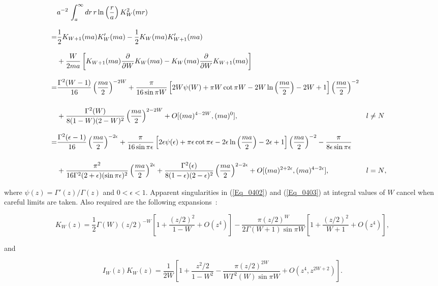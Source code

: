 \documentclass[a4paper,twocolumn,showpacs,preprintnumbers,amsmath,amssymb]{revtex4}
\newcommand{\half}{\frac{1}{2}}
\newcommand{\pdo}[1]{\ensuremath{\frac{\partial }
        {\partial #1 }}}
\begin{document}
\begin{widetext}
\begin{alignat}{2}
\label{Eq_0401}
\nonumber
\lefteqn{a^{-2} \,
 \int^{\infty}_a dr \, r \ln \left(\frac{r}{a}\right) K^2_W(mr)}\\[3mm]
\nonumber
  =& \half K_{W+1}(ma) K'_W(ma) - \half K_W(ma) K'_{W+1}(ma)&&\\[3mm]
  &  + \frac{W}{2ma}
  \left[
  K_{W+1}(ma) \pdo{W}K_W(ma) - K_W(ma) \pdo{W}K_{W+1}(ma)
  \right]&&\\[3mm]
\label{Eq_0402}
\nonumber
  =& \frac{\Gamma^2(W-1)}{16} \left(\frac{ma}{2}\right)^{-2W}
  + \frac{\pi}{16 \sin \pi W}
  \left[
  2W \psi(W) + \pi W \cot \pi W
  - 2W \ln \left(\frac{ma}{2}\right) - 2W + 1
  \right]
  \left(\frac{ma}{2}\right)^{-2}&\\[5mm]
  &
  + \frac{\Gamma^2(W)}{8 (1-W) (2-W)^2} \left(\frac{ma}{2}\right)^{2-2W}
  + O[(ma)^{4-2W}, (ma)^0],& l \neq N&\\[3mm]
\label{Eq_0403}
\nonumber
  =& \frac{\Gamma^2(\epsilon - 1)}{16}
  \left(\frac{ma}{2}\right)^{-2\epsilon} + \frac{\pi}{16 \sin \pi\epsilon}
  \left[
  2\epsilon \psi(\epsilon) + \pi \epsilon \cot \pi \epsilon
  - 2 \epsilon \ln \left(\frac{ma}{2}\right) - 2 \epsilon + 1
  \right]
  \left(\frac{ma}{2}\right)^{-2}
  - \frac{\pi}{8 \epsilon \sin \pi \epsilon}&&\\[5mm]
  &
  + \frac{\pi^2}{16\Gamma^2(2 + \epsilon)(\sin \pi \epsilon)^2}
  \left(\frac{ma}{2}\right)^{2\epsilon}
  + \frac{\Gamma^2(\epsilon)}{8(1-\epsilon)(2-\epsilon)^2}
    \left(\frac{ma}{2}\right)^{2-2\epsilon}
  + O[(ma)^{2 + 2\epsilon}, (ma)^{4-2\epsilon}],& l = N&,
\end{alignat}
\end{widetext}


\noindent
where $\psi(z) = \Gamma'(z)/ \Gamma(z)$ and
$0 < \epsilon < 1$. Apparent singularities in (\ref{Eq_0402}) and
(\ref{Eq_0403}) at integral values of $W$ cancel when careful limits
are taken. Also required are the following
expansions~\cite{Abramowitz64}:

\begin{widetext}
\begin{equation}
\label{Eq_0404}
K_W(z) = \half \Gamma(W)(z/2)^{-W}
  \left[
  1 + \frac{(z/2)^2}{1-W} + O(z^4)
  \right]
  - \frac{\pi(z/2)^W}{2\Gamma(W+1) \sin \pi W}
  \left[
  1 + \frac{(z/2)^2}{W+1} + O(z^4)
  \right],
\end{equation}

\noindent
and

\begin{equation}
\label{Eq_0405}
I_W(z) K_W(z) = \frac{1}{2W}
  \left[
  1 + \frac{z^2/2}{1-W^2}
  - \frac{\pi(z/2)^{2W}}{W\Gamma^2(W) \sin \pi W}
  + O(z^4, z^{2W+2})
  \right].
\end{equation}
\end{widetext}
\end{document}
